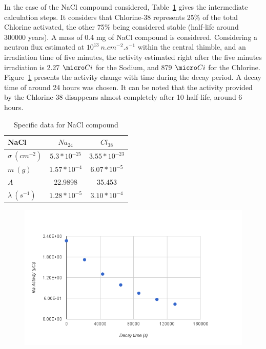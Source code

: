 In the case of the NaCl compound considered, Table~\ref{tab:nacl} gives the intermediate calculation steps. It considers that Chlorine-38 represents 25\% of the total Chlorine activated, the other 75\% being considered stable (half-life around 300000 years). A mass of 0.4 mg of NaCl compound is considered. Considering a neutron flux estimated at $10^{13}\ n.cm^{-2}.s^{-1}$ within the central thimble, and an irradiation time of five minutes, the activity estimated right after the five minutes irradiation is 2.27 $\micro Ci$ for the Sodium, and 879 $\micro Ci$ for the Chlorine. Figure~\ref{fig:dec} presents the activity change with time during the decay period. A decay time of around 24 hours was chosen. It can be noted that the activity provided by the Chlorine-38 disappears almost completely after 10 half-life, around 6 hours.

\begin{table}[t]
\centering
\caption{Specific data for NaCl compound}
\label{tab:nacl}
\begin{tabular}{|l|c|c|}
\hline
NaCl               & $Na_{24}$      & $Cl_{38}$       \\ \hline
$\sigma \ (cm^{-2})$ & $5.3*10^{-25}$ & $3.55*10^{-23}$ \\ \hline
$m\ (g)$            & $1.57*10^{-4}$ & $6.07*10^{-5}$  \\ \hline
$A$                & 22.9898        & 35.453          \\ \hline
$\lambda \ (s^{-1})$ & $1.28*10^{-5}$ & $3.10*10^{-4}$  \\ \hline
\end{tabular}
\end{table}

\begin{figure}[t!]
	\centering
	\includegraphics[height=0.4\textheight]{fig01/decay.png}
	\label{fig:dec}
\end{figure}

